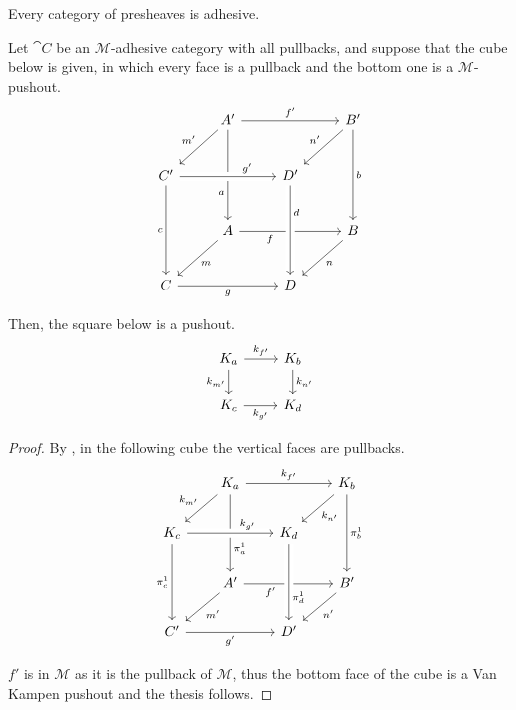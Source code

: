 \begin{cor}\label{cor:presh_adhesive}
    Every category of presheaves is adhesive.
\end{cor}


\begin{lemma}
    Let $\cat C$ be an $\mathcal{M}$-adhesive category with all pullbacks, and suppose that the cube below is given, in which every face is a pullback and the bottom one is a $\mathcal{M}$-pushout.
        \[\begin{tikzcd}[row sep=25, column sep=25]
	& {A'} && {B'} \\
	{C'} && {D'} \\
	& A && B \\
	C && D
	\arrow["{f'}", from=1-2, to=1-4]
	\arrow["{m'}"', from=1-2, to=2-1]
	\arrow["a"'{pos=0.7}, from=1-2, to=3-2]
	\arrow["{n'}"', from=1-4, to=2-3]
	\arrow["b", from=1-4, to=3-4]
	\arrow["{g'}"{pos=0.7}, from=2-1, to=2-3, crossing over]
	\arrow["c"', from=2-1, to=4-1]
	\arrow["f"'{pos=0.3}, from=3-2, to=3-4]
	\arrow["d"{pos=0.3}, from=2-3, to=4-3, crossing over]
	\arrow["m", from=3-2, to=4-1]
	\arrow["n", from=3-4, to=4-3]
	\arrow["g"', from=4-1, to=4-3]
    \end{tikzcd}\]
    
    Then, the square below is a pushout.
    \[
        \begin{tikzcd}%
            {K_a} \ar[r, "{k_{f'}}"] \ar[d, "{k_{m'}}"'] & {K_b} \ar[d, "{k_{n'}}"] \\
            {K_c} \ar[r, "{k_{g'}}"'] & {K_d}
        \end{tikzcd}
    \]
\end{lemma}

\begin{proof}
    By , in the following cube the vertical faces are pullbacks.
    \[\begin{tikzcd}[row sep = 20, column sep = 20]
        & {K_a} && {K_b} \\
        {K_c} && {K_d} \\
        & {A'} && {B'} \\
        {C'} && {D'}
        \arrow["{k_{f'}}", from=1-2, to=1-4]
        \arrow["{k_{m'}}"', from=1-2, to=2-1]
        \arrow["{\pi_a^1}"{pos=0.7}, from=1-2, to=3-2]
        \arrow["{k_{n'}}", from=1-4, to=2-3]
        \arrow["{\pi_b^1}", from=1-4, to=3-4]
        \arrow["{k_{g'}}"{pos=0.7}, from=2-1, to=2-3, crossing over]
        \arrow["{\pi_c^1}"', from=2-1, to=4-1]
        \arrow["{f'}"'{pos=0.3}, from=3-2, to=3-4]
        \arrow["{\pi_d^1}"{pos=0.7}, from=2-3, to=4-3, crossing over]
        \arrow["{m'}", from=3-2, to=4-1]
        \arrow["{n'}", from=3-4, to=4-3]
        \arrow["{g'}"', from=4-1, to=4-3]
    \end{tikzcd}\]

	$f'$ is in $\mathcal{M}$ as it is the pullback of $\mathcal{M}$, thus the bottom face of the cube is a Van Kampen pushout and the thesis follows.

\end{proof}


